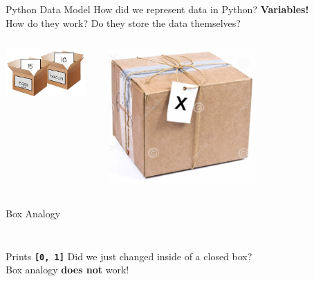     \begin{frame}{Python Data Model}
        \pause
        \LARGE
        How did we represent data in Python?
        \pause
         \textbf{Variables!}\\
        \pause
        How do they work?
        \pause
         Do they store the data themselves?
        \pause
        \begin{columns}
            \begin{column}{0.5\textwidth}
                \includegraphics[width=0.9\textwidth]{../Lecture6/images/box.jpg}
            \end{column}
            \pause
            \begin{column}{0.5\textwidth}
                \includegraphics[width=0.6\textwidth]{../Lecture6/images/box_tag.jpg}
            \end{column}
        \end{columns}
        
    \end{frame}

    \begin{frame}{Box Analogy}
        \LARGE
        \pause
        \inputminted[frame=single,framesep=2pt,firstline=8,lastline=10]{python3}{../Lecture6/code-examples/cartoons_box_analogy.py}
        \pause
        \inputminted[frame=single,framesep=2pt,firstline=18]{python3}{../Lecture6/code-examples/cartoons_box_analogy.py}
        \pause
        Prints \textbf{\texttt{[0, 1]}}
        \newline
        \pause
        Did we just changed inside of a closed box?\\
        \pause 
         Box analogy \textbf{does not} work!
    \end{frame}

